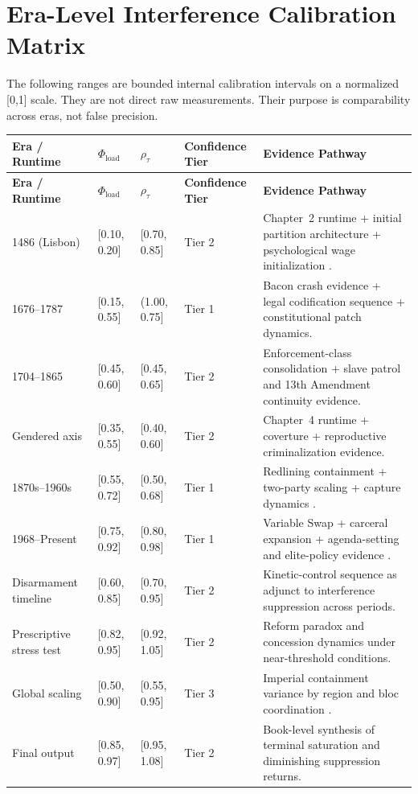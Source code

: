 \documentclass[12pt,openany]{book}
\begin{document}
\section{Era-Level Interference Calibration Matrix}

The following ranges are bounded internal calibration intervals on a normalized [0,1] scale. They are not direct raw measurements. Their purpose is comparability across eras, not false precision.

\begin{longtable}{>{\raggedright}p{3.4cm} >{\raggedright}p{2.3cm} >{\raggedright}p{2.1cm} >{\raggedright}p{2.4cm} >{\raggedright\arraybackslash}p{4.9cm}}
\toprule
\textbf{Era / Runtime} & \textbf{$\Phi_{\text{load}}$} & \textbf{$\rho_{\tau}$} & \textbf{Confidence Tier} & \textbf{Evidence Pathway} \\
\midrule
\endfirsthead
\toprule
\textbf{Era / Runtime} & \textbf{$\Phi_{\text{load}}$} & \textbf{$\rho_{\tau}$} & \textbf{Confidence Tier} & \textbf{Evidence Pathway} \\
\midrule
\endhead
1486 (Lisbon) & [0.10, 0.20] & [0.70, 0.85] & Tier 2 & Chapter~2 runtime + initial partition architecture + psychological wage initialization \cite{dubois}. \\
1676--1787 & [0.15, 0.55] & (1.00, 0.75] & Tier 1 & Bacon crash evidence + legal codification sequence + constitutional patch dynamics. \\
1704--1865 & [0.45, 0.60] & [0.45, 0.65] & Tier 2 & Enforcement-class consolidation + slave patrol and 13th Amendment continuity evidence. \\
Gendered axis & [0.35, 0.55] & [0.40, 0.60] & Tier 2 & Chapter~4 runtime + coverture + reproductive criminalization evidence. \\
1870s--1960s & [0.55, 0.72] & [0.50, 0.68] & Tier 1 & Redlining containment + two-party scaling + capture dynamics \cite{rothstein, coatesreparations}. \\
1968--Present & [0.75, 0.92] & [0.80, 0.98] & Tier 1 & Variable Swap + carceral expansion + agenda-setting and elite-policy evidence \cite{gilens}. \\
Disarmament timeline & [0.60, 0.85] & [0.70, 0.95] & Tier 2 & Kinetic-control sequence as adjunct to interference suppression across periods. \\
Prescriptive stress test & [0.82, 0.95] & [0.92, 1.05] & Tier 2 & Reform paradox and concession dynamics under near-threshold conditions. \\
Global scaling & [0.50, 0.90] & [0.55, 0.95] & Tier 3 & Imperial containment variance by region and bloc coordination \cite{ohchr2026}. \\
Final output & [0.85, 0.97] & [0.95, 1.08] & Tier 2 & Book-level synthesis of terminal saturation and diminishing suppression returns. \\
\bottomrule
\end{longtable}
\end{document}
